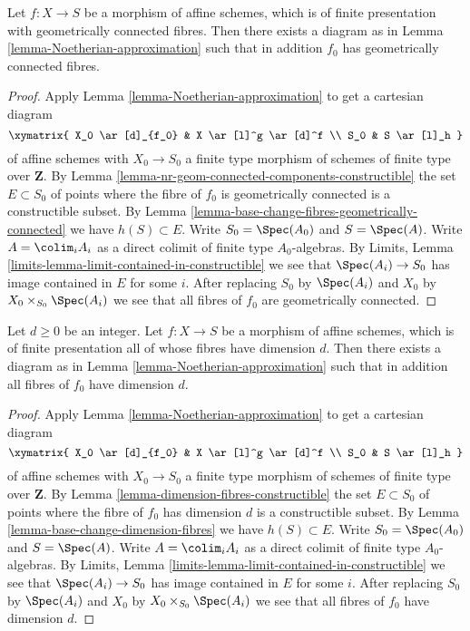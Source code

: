 \begin{lemma}
\label{lemma-Noetherian-approximation-geometrically-connected}
Let $f : X \to S$ be a morphism of affine schemes, which is
of finite presentation with geometrically connected fibres.
Then there exists a diagram as in
Lemma \ref{lemma-Noetherian-approximation}
such that in addition $f_0$ has geometrically connected fibres.
\end{lemma}

\begin{proof}
Apply
Lemma \ref{lemma-Noetherian-approximation}
to get a cartesian diagram
$$
\xymatrix{
X_0 \ar[d]_{f_0} & X \ar[l]^g \ar[d]^f \\
S_0 & S \ar[l]_h
}
$$
of affine schemes with $X_0 \to S_0$ a finite type morphism of
schemes of finite type over $\mathbf{Z}$. By
Lemma \ref{lemma-nr-geom-connected-components-constructible}
the set $E \subset S_0$ of points where the fibre of
$f_0$ is geometrically connected is a constructible subset. By
Lemma \ref{lemma-base-change-fibres-geometrically-connected}
we have $h(S) \subset E$. Write $S_0 = \Spec(A_0)$ and
$S = \Spec(A)$. Write $A = \colim_i A_i$ as a
direct colimit of finite type $A_0$-algebras. By
Limits, Lemma \ref{limits-lemma-limit-contained-in-constructible}
we see that $\Spec(A_i) \to S_0$ has image contained in $E$
for some $i$. After replacing $S_0$ by $\Spec(A_i)$ and
$X_0$ by $X_0 \times_{S_0} \Spec(A_i)$ we see that
all fibres of $f_0$ are geometrically connected.
\end{proof}

\begin{lemma}
\label{lemma-Noetherian-approximation-dimension-d}
Let $d \geq 0$ be an integer.
Let $f : X \to S$ be a morphism of affine schemes, which is
of finite presentation all of whose fibres have dimension $d$.
Then there exists a diagram as in
Lemma \ref{lemma-Noetherian-approximation}
such that in addition all fibres of $f_0$ have dimension $d$.
\end{lemma}

\begin{proof}
Apply
Lemma \ref{lemma-Noetherian-approximation}
to get a cartesian diagram
$$
\xymatrix{
X_0 \ar[d]_{f_0} & X \ar[l]^g \ar[d]^f \\
S_0 & S \ar[l]_h
}
$$
of affine schemes with $X_0 \to S_0$ a finite type morphism of
schemes of finite type over $\mathbf{Z}$. By
Lemma \ref{lemma-dimension-fibres-constructible}
the set $E \subset S_0$ of points where the fibre of
$f_0$ has dimension $d$ is a constructible subset. By
Lemma \ref{lemma-base-change-dimension-fibres}
we have $h(S) \subset E$. Write $S_0 = \Spec(A_0)$ and
$S = \Spec(A)$. Write $A = \colim_i A_i$ as a
direct colimit of finite type $A_0$-algebras. By
Limits, Lemma \ref{limits-lemma-limit-contained-in-constructible}
we see that $\Spec(A_i) \to S_0$ has image contained in $E$
for some $i$. After replacing $S_0$ by $\Spec(A_i)$ and
$X_0$ by $X_0 \times_{S_0} \Spec(A_i)$ we see that
all fibres of $f_0$ have dimension $d$.
\end{proof}

